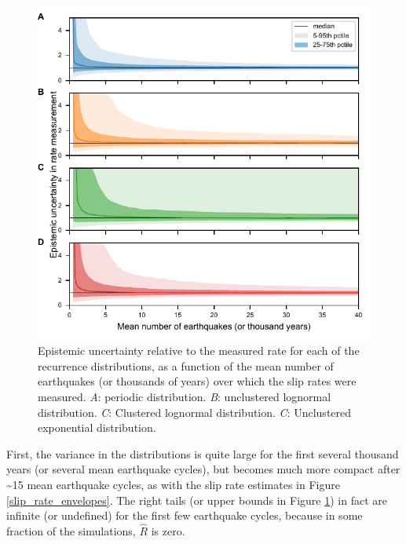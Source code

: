 \documentclass[se]{copernicus}
\begin{document}
\begin{figure}[t]
  \includegraphics[width=12cm]{./figures/epist_unc.pdf}
  \caption{Epistemic uncertainty relative to the measured rate for each of the 
  recurrence distributions, as a function of the mean number of earthquakes (or 
  thousands of years) over which the slip rates were measured. \emph{A}: 
  periodic distribution. \emph{B}: unclustered lognormal distribution. 
  \emph{C}: Clustered lognormal distribution. \emph{C}: Unclustered exponential 
  distribution.
  \label{epist_unc}}
\end{figure}

First, the variance in the distributions is quite large for the first
several thousand years (or several mean earthquake cycles), but becomes
much more compact after \textasciitilde{}15 mean earthquake cycles, as
with the slip rate estimates in Figure \ref{slip_rate_envelopes}. The
right tails (or upper bounds in Figure \ref{epist_unc}) in fact are
infinite (or undefined) for the first few earthquake cycles, because in
some fraction of the simulations, \(\hat{R}\) is zero.
\end{document}
